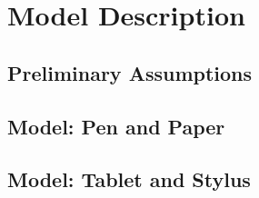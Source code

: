 \section{Model Description}\label{sec:model_description}


\subsection{Preliminary Assumptions}\label{subsec:assumptions}


\subsection{Model: Pen and Paper}\label{subsec:model_pen_paper}


\subsection{Model: Tablet and Stylus}\label{subsec:model_tablet_stylus}